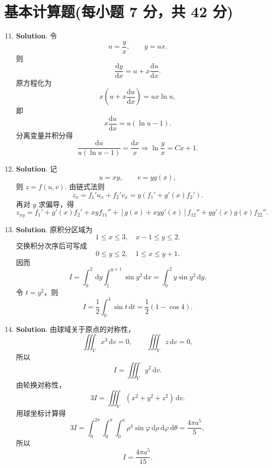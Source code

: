 \documentclass[../Main.tex]{subfiles}
\begin{document}
\section{基本计算题(每小题 7 分，共 42 分)}
\begin{enumerate}
    \setcounter{enumi}{10}
    \item \textbf{Solution}. 令
          \[
              u=\frac{y}{x},\qquad y=ux.
          \]
          则
          \[
              \frac{\mathrm{d}y}{\mathrm{d}x}=u+x\frac{\mathrm{d}u}{\mathrm{d}x}.
          \]
          原方程化为
          \[
              x\left(u+x\frac{\mathrm{d}u}{\mathrm{d}x}\right)=ux\ln u,
          \]
          即
          \[
              x\frac{\mathrm{d}u}{\mathrm{d}x}=u(\ln u-1).
          \]
          分离变量并积分得
          \[
              \frac{\mathrm{d}u}{u(\ln u-1)}=\frac{\mathrm{d}x}{x}
              \Longrightarrow
              \ln\frac{y}{x}=Cx+1.
          \]

    \item \textbf{Solution}. 记
          \[
              u=xy,\qquad v=yg(x),
          \]
          则 \(z=f(u,v)\). 由链式法则
          \[
              z_x=f_1'u_x+f_2'v_x=y(f_1'+g'(x)f_2').
          \]
          再对 \(y\) 求偏导，得
          \[
              z_{xy}=f_1'+g'(x)f_2'+xyf_{11}''+[g(x)+xyg'(x)]f_{12}''+yg'(x)g(x)f_{22}''.
          \]

    \item \textbf{Solution}. 原积分区域为
          \[
              1\le x\le 3,\quad x-1\le y\le 2.
          \]
          交换积分次序后可写成
          \[
              0\le y\le 2,\quad 1\le x\le y+1.
          \]
          因而
          \[
              I=\int_0^2\,\mathrm{d}y\int_1^{y+1}\sin y^2\,\mathrm{d}x
              =\int_0^2 y\sin y^2\,\mathrm{d}y.
          \]
          令 \(t=y^2\)，则
          \[
              I=\frac12\int_0^4\sin t\,\mathrm{d}t
              =\frac12(1-\cos4).
          \]

    \item \textbf{Solution}. 由球域关于原点的对称性，
          \[
              \iiint_V x^3\,\mathrm{d}v=0,\qquad \iiint_V z\,\mathrm{d}v=0,
          \]
          所以
          \[
              I=\iiint_V y^2\,\mathrm{d}v.
          \]
          由轮换对称性，
          \[
              3I=\iiint_V(x^2+y^2+z^2)\,\mathrm{d}v.
          \]
          用球坐标计算得
          \[
              3I=\int_0^{2\pi}\int_0^\pi\int_0^a \rho^4\sin\varphi\,\mathrm{d}\rho\,\mathrm{d}\varphi\,\mathrm{d}\theta
              =\frac{4\pi a^5}{5},
          \]
          所以
          \[
              I=\frac{4\pi a^5}{15}.
          \]


\end{enumerate}
\end{document}
